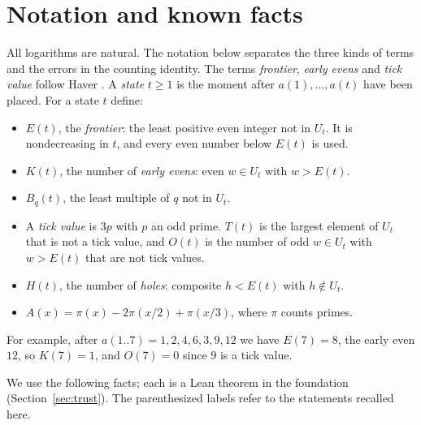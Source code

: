 \documentclass[11pt]{article}
\theoremstyle{definition}
\theoremstyle{remark}
\newcommand{\U}{U}
\begin{document}
\section{Notation and known facts}\label{sec:notation}

All logarithms are natural. The notation below separates the three kinds
of terms and the errors
in the counting identity. The terms \emph{frontier}, \emph{early evens} and \emph{tick value}
follow Haver \cite[\S\S1--2]{haver}.
A \emph{state} $t\ge1$ is the moment after $a(1),\dots,a(t)$ have been
placed. For a state $t$ define:
\begin{itemize}
\item $E(t)$, the \emph{frontier}: the least positive even integer not in
  $\U_t$. It is nondecreasing in $t$, and every even number below $E(t)$
  is used.
\item $K(t)$, the number of \emph{early evens}: even $w\in\U_t$ with
  $w>E(t)$.
\item $B_q(t)$, the least multiple of $q$ not in $\U_t$.
\item A \emph{tick value} is $3p$ with $p$ an odd prime. $T(t)$ is the
  largest element of $\U_t$ that is not a tick value, and $O(t)$ is the
  number of odd $w\in\U_t$ with $w>E(t)$ that are not tick values.
\item $H(t)$, the number of \emph{holes}: composite $h<E(t)$ with
  $h\notin\U_t$.
\item $A(x)=\pi(x)-2\pi(x/2)+\pi(x/3)$, where $\pi$ counts primes.
\end{itemize}
For example, after $a(1..7)=1,2,4,6,3,9,12$ we have $E(7)=8$, the early
even $12$, so $K(7)=1$, and $O(7)=0$ since $9$ is a tick value.

We use the following facts; each is a Lean theorem in the foundation
(Section~\ref{sec:trust}). The parenthesized labels refer to the
statements recalled here.
\end{document}
